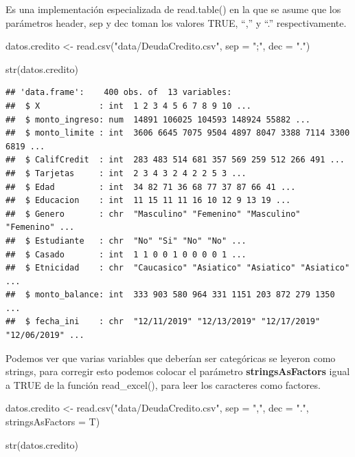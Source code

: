 \documentclass[
  12pt,
]{book}
\newenvironment{Shaded}{\begin{snugshade}}{\end{snugshade}}
\newcommand{\AttributeTok}[1]{\textcolor[rgb]{0.77,0.63,0.00}{#1}}
\newcommand{\FunctionTok}[1]{\textcolor[rgb]{0.00,0.00,0.00}{#1}}
\newcommand{\NormalTok}[1]{#1}
\newcommand{\OtherTok}[1]{\textcolor[rgb]{0.56,0.35,0.01}{#1}}
\newcommand{\StringTok}[1]{\textcolor[rgb]{0.31,0.60,0.02}{#1}}
\begin{document}
Es una implementación especializada de read.table() en la que se asume
que los parámetros header, sep y dec toman los valores TRUE, ``,'' y ``.'' respectivamente.

\begin{Shaded}
\begin{Highlighting}[]
\NormalTok{datos.credito }\OtherTok{\textless{}{-}} \FunctionTok{read.csv}\NormalTok{(}\StringTok{"data/DeudaCredito.csv"}\NormalTok{, }\AttributeTok{sep =} \StringTok{";"}\NormalTok{, }\AttributeTok{dec =} \StringTok{"."}\NormalTok{)}

\FunctionTok{str}\NormalTok{(datos.credito)}
\end{Highlighting}
\end{Shaded}

\begin{verbatim}
## 'data.frame':    400 obs. of  13 variables:
##  $ X            : int  1 2 3 4 5 6 7 8 9 10 ...
##  $ monto_ingreso: num  14891 106025 104593 148924 55882 ...
##  $ monto_limite : int  3606 6645 7075 9504 4897 8047 3388 7114 3300 6819 ...
##  $ CalifCredit  : int  283 483 514 681 357 569 259 512 266 491 ...
##  $ Tarjetas     : int  2 3 4 3 2 4 2 2 5 3 ...
##  $ Edad         : int  34 82 71 36 68 77 37 87 66 41 ...
##  $ Educacion    : int  11 15 11 11 16 10 12 9 13 19 ...
##  $ Genero       : chr  "Masculino" "Femenino" "Masculino" "Femenino" ...
##  $ Estudiante   : chr  "No" "Si" "No" "No" ...
##  $ Casado       : int  1 1 0 0 1 0 0 0 0 1 ...
##  $ Etnicidad    : chr  "Caucasico" "Asiatico" "Asiatico" "Asiatico" ...
##  $ monto_balance: int  333 903 580 964 331 1151 203 872 279 1350 ...
##  $ fecha_ini    : chr  "12/11/2019" "12/13/2019" "12/17/2019" "12/06/2019" ...
\end{verbatim}

Podemos ver que varias variables que deberían ser categóricas se leyeron como strings, para corregir esto podemos colocar el parámetro \textbf{stringsAsFactors} igual a TRUE de la función read\_excel(), para leer los caracteres como factores.

\begin{Shaded}
\begin{Highlighting}[]
\NormalTok{datos.credito }\OtherTok{\textless{}{-}} \FunctionTok{read.csv}\NormalTok{(}\StringTok{"data/DeudaCredito.csv"}\NormalTok{, }\AttributeTok{sep =} \StringTok{","}\NormalTok{, }\AttributeTok{dec =} \StringTok{"."}\NormalTok{, }\AttributeTok{stringsAsFactors =}\NormalTok{ T)}

\FunctionTok{str}\NormalTok{(datos.credito)}
\end{Highlighting}
\end{Shaded}
\end{document}

